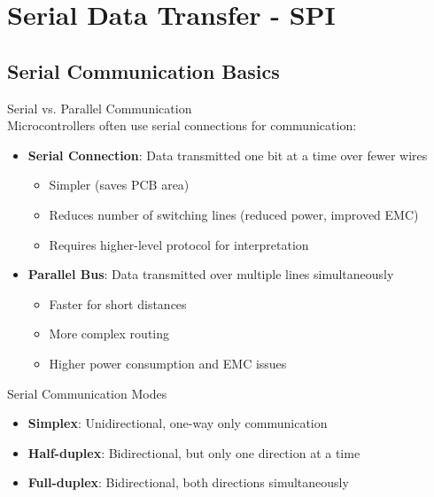 \section{Serial Data Transfer - SPI}

\subsection{Serial Communication Basics}

\begin{concept}{Serial vs. Parallel Communication}\\
Microcontrollers often use serial connections for communication:
\begin{itemize}
    \item \textbf{Serial Connection}: Data transmitted one bit at a time over fewer wires
    \begin{itemize}
        \item Simpler (saves PCB area)
        \item Reduces number of switching lines (reduced power, improved EMC)
        \item Requires higher-level protocol for interpretation
    \end{itemize}
    \item \textbf{Parallel Bus}: Data transmitted over multiple lines simultaneously
    \begin{itemize}
        \item Faster for short distances
        \item More complex routing
        \item Higher power consumption and EMC issues
    \end{itemize}
\end{itemize}
\end{concept}

\begin{definition}{Serial Communication Modes}
\begin{itemize}
    \item \textbf{Simplex}: Unidirectional, one-way only communication
    \item \textbf{Half-duplex}: Bidirectional, but only one direction at a time
    \item \textbf{Full-duplex}: Bidirectional, both directions simultaneously
\end{itemize}
\end{definition}

